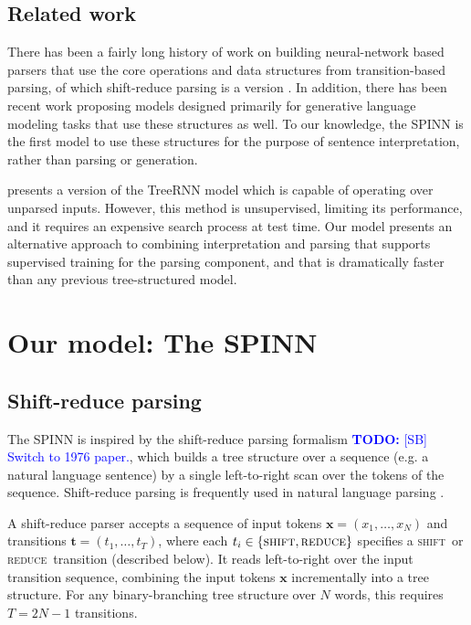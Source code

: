 \documentclass[11pt]{article}
\newcommand\todo[1]{\textcolor{blue}{\textbf{TODO:} #1}}
\newcommand{\shift}{\textsc{shift}}
\newcommand{\reduce}{\textsc{reduce}}
\begin{document}
\subsection{Related work}

There has been a fairly long history of work on building neural-network based parsers that use the core operations and data structures from transition-based parsing, of which shift-reduce parsing is a version \citep{henderson2004discriminative,emami2005neural,titov2010latent,chen2014,buys2generative,dyer-EtAl:2015:ACL-IJCNLP,kiperwasser2016easy}. In addition, there has been recent work \citep{zhang2016top,dyer2016rnn} proposing models designed primarily for generative language modeling tasks that use these structures as well. To our knowledge, the SPINN is the first model to use these structures for the purpose of sentence interpretation, rather than parsing or generation.

\citet{socher2011dynamic} presents a version of the TreeRNN model which is capable of operating over unparsed inputs. However, this method is unsupervised, limiting its performance, and it requires an expensive search process at test time. Our model presents an alternative approach to combining interpretation and parsing that supports supervised training for the parsing component, and that is dramatically faster than any previous tree-structured model. 

\section{Our model: The SPINN}

\subsection{Shift-reduce parsing}

The SPINN is inspired by the shift-reduce parsing formalism \citep{aho1986compilers} \todo{[SB] Switch to 1976 paper.}, which builds a tree structure over a sequence (e.g. a natural language sentence) by a single left-to-right scan over the tokens of the sequence. Shift-reduce parsing is frequently used in natural language parsing \citep[e.g.][]{nivre2003efficient}.

A shift-reduce parser accepts a sequence of input tokens $\mathbf x = (x_1, \dots, x_N)$ and transitions $\mathbf t = (t_1, \dots, t_T)$, where each $t_i \in \{\shift, \reduce\}$ specifies a \shift~or \reduce~transition (described below). It reads left-to-right over the input transition sequence, combining the input tokens $\mathbf x$ incrementally into a tree structure. For any binary-branching tree structure over $N$ words, this requires $T = 2N - 1$ transitions.
\end{document}
